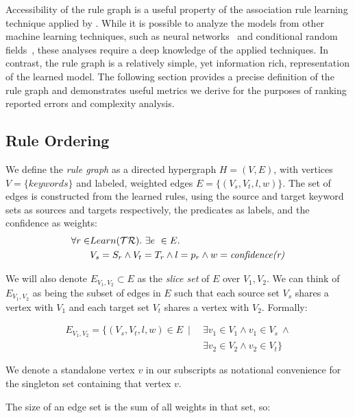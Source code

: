 Accessibility of the rule graph is a useful property of the association 
rule learning technique applied by \app.
While it is possible to analyze the models from other machine learning techniques, such as neural networks~\cite{lei2016rationalizing} and
conditional random fields~\cite{raychev2015predicting}, these analyses require a deep knowledge of the applied techniques.
In contrast, the rule graph is a relatively simple, yet information rich, representation of the learned model.
The following section provides a precise definition of the rule graph
and demonstrates useful metrics we derive for the purposes of ranking reported errors
and complexity analysis.

\subsection{Rule Ordering}
\label{sec:ruleorder}

We define the \textit{rule graph} as a directed hypergraph $H = (V,E)$,
   with vertices $V = \{ keywords \}$ and labeled, weighted edges $E = \{ (V_s, V_t, l, w) \}$.
The set of edges is constructed from the learned rules, using the source and target keyword sets as sources and targets respectively, the predicates as labels, and the confidence as weights:
%
\begin{align*}
\forall r \in & Learn(\mathcal{TR}).\ \exists e\ \in E.\\
              & V_s = S_r \land V_t=T_r \land l=p_r \land w =
\textit{confidence(r)}
\end{align*}

We will also denote $E_{V_1, V_2} \subset E$ as the \textit{slice set} 
of $E$ over $V_1, V_2$.
We can think of $E_{V_1, V_2}$ as being the subset of edges in $E$ 
such that each source set $V_s$ shares a vertex with $V_1$
and each target set $V_t$ shares a vertex with $V_2$.
Formally: 

\begin{align*}
    E_{V_1, V_2} = \{ \left( V_s, V_t, l, w \right) \in E \ \mid \ & \exists v_1 \in V_1 \land v_1 \in V_s \ \land\\
    & \exists v_2 \in V_2 \land v_2 \in V_t \}
\end{align*}


We denote a standalone vertex $v$ in our subscripts as notational 
convenience for the singleton set containing that vertex $v$.

The size of an edge set is the sum of all weights in that set, so:

